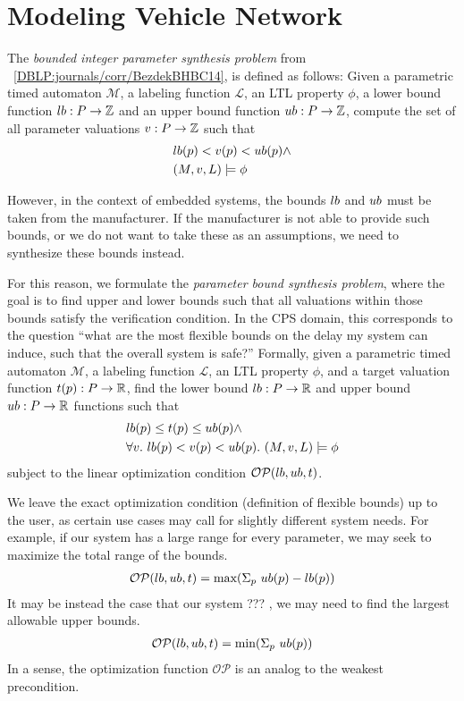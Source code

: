 \section{Modeling Vehicle Network}
 
The \textit{bounded integer parameter synthesis problem} from ~\ref{DBLP:journals/corr/BezdekBHBC14}, is defined as follows:
Given a parametric timed automaton $\mathcal{M}$, a labeling function $\mathcal{L}$, an LTL property $\phi$, a lower bound function $lb: P \to \mathbb{Z}$ and an upper bound function $ub: P \to \mathbb{Z} $, 
  compute the set of all parameter valuations $v: P \to \mathbb{Z}$ such that 
\begin{align*}
  &lb(p) < v(p) < ub(p) \land \\
  &(M,v,L) \models \phi
\end{align*}

However, in the context of embedded systems, the bounds $lb$ and $ub$ must be taken from the manufacturer.
If the manufacturer is not able to provide such bounds, or we do not want to take these as an assumptions, we need to synthesize these bounds instead.

For this reason, we formulate the \textit{parameter bound synthesis problem}, where the goal is to find upper and lower bounds such that all valuations within those bounds satisfy the verification condition.
In the CPS domain, this corresponds to the question ``what are the most flexible bounds on the delay my system can induce, such that the overall system is safe?''
Formally, given a parametric timed automaton $\mathcal{M}$, a labeling function $\mathcal{L}$, an LTL property $\phi$, and a target valuation function $t(p): P \to \mathbb{R}$,
find the lower bound $lb: P \to \mathbb{R}$ and upper bound $ub : P \to \mathbb{R}$ functions such that 
%
\begin{align*}
  &lb(p) \leq t(p) \leq ub(p) \land \\ 
  &\forall v.\ lb(p) < v(p) < ub(p).\ (M, v,L) \models \phi
\end{align*}
%
subject to the linear optimization condition $\mathcal{OP}(lb,ub,t)$.

We leave the exact optimization condition (definition of flexible bounds) up to the user, as certain use cases may call for slightly different system needs.
For example, if our system has a large range for every parameter, we may seek to maximize the total range of the bounds.
%
\begin{align*}
\mathcal{OP}(lb,ub,t) = \text{max}(\Sigma_{p} \ ub(p) - lb(p))
\end{align*}
%
It may be instead the case that our system ??? , we may need to find the largest allowable upper bounds.
\begin{align*}
\mathcal{OP}(lb,ub,t) = \text{min}(\Sigma_{p} \ ub(p))
\end{align*}
%
In a sense, the optimization function $\mathcal{OP}$ is an analog to the weakest precondition.

